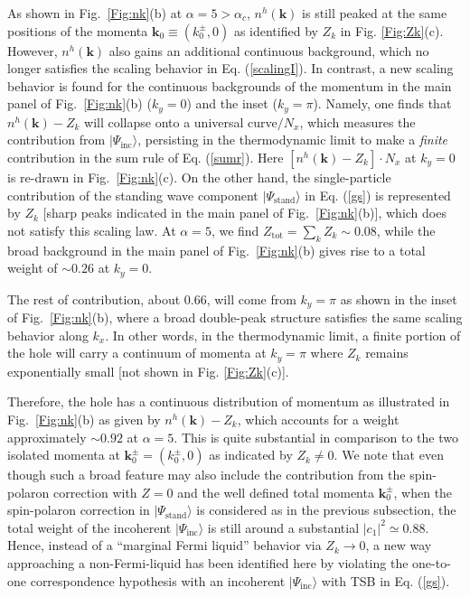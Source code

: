 \documentclass[aps,prb,twocolumn,notitlepage,superscriptaddress,showpacs]{revtex4-1}
\begin{document}
As shown in Fig.~\ref{Fig:nk}(b) at $\alpha=5>\alpha_c$, $n^h({\textbf{k}})$ is still peaked at the same positions of the momenta ${\textbf{k}}_0\equiv (k_0^{\pm}, 0)$ as identified by $Z_k$ in Fig. \ref{Fig:Zk}(c). However, $n^h({\textbf{k}})$ also gains an additional continuous background, which no longer satisfies the scaling behavior in Eq. (\ref{scalingI}). In contrast,  a new scaling behavior is found for the continuous backgrounds of the momentum in the main panel of Fig.~\ref{Fig:nk}(b) ($k_y=0$) and the inset ($k_y=\pi$). Namely, one finds that $n^h({\textbf{k}})-Z_k$ will collapse onto a universal curve$/N_x$, which measures the contribution from $|\Psi_{\mathrm {inc}}\rangle $, persisting in the thermodynamic limit to make a \emph{finite} contribution in the sum rule of Eq. (\ref{sumr}). Here $[n^h({\textbf{k}})-Z_k]\cdot N_x$ at $k_y=0$ is re-drawn in Fig.~\ref{Fig:nk}(c). On the other hand, the single-particle contribution of the standing wave component $|\Psi_{\mathrm {stand}}\rangle$ in Eq. (\ref{gs}) is represented by $Z_k$ [sharp peaks indicated in the main panel of Fig.~\ref{Fig:nk}(b)], which does not satisfy this scaling law.
At $\alpha=5$, we find $Z_{\mathrm{tot}}=\sum_k Z_k \sim 0.08$, while the broad background in the main panel of Fig.~\ref{Fig:nk}(b) gives rise to a total weight of $\sim 0.26$ at $k_y=0$.

The rest of contribution, about $0.66$, will come from $k_y=\pi$ as shown in the inset of
Fig.~\ref{Fig:nk}(b), where a broad double-peak structure satisfies the same scaling behavior along $k_x$. In other words, in the thermodynamic limit, a finite portion of the hole will carry a continuum of momenta at $k_y=\pi$ where $Z_k$ remains exponentially small [not shown in Fig. \ref{Fig:Zk}(c)].

Therefore, the hole has a continuous distribution of momentum as illustrated in Fig.~\ref{Fig:nk}(b) as given by $n^h({\textbf{k}})-Z_k$, which accounts for a weight approximately $\sim 0.92$ at $\alpha=5$. This is quite substantial in comparison to the two isolated momenta at ${\textbf{k}}^{\pm}_0=(k_0^{\pm},0)$ as indicated by $Z_k\neq 0$. We note that even though such a broad feature may also include the contribution from the spin-polaron correction with $Z=0$ and the well defined total momenta ${\textbf{k}}^{\pm}_0$,   when the spin-polaron correction in $|\Psi_{\mathrm {stand}}\rangle$ is considered as in the previous subsection, the total weight of the incoherent $|\Psi_{\mathrm {inc}}\rangle $ is still around a substantial $|c_1|^2 \simeq 0.88$. Hence, instead of a ``marginal Fermi liquid'' behavior \cite{Anderson} via $Z_{k} \rightarrow 0$, a new way approaching a non-Fermi-liquid has been identified here by violating the one-to-one correspondence hypothesis with an incoherent $|\Psi_{\mathrm {inc}}\rangle $ with TSB in Eq. (\ref{gs}).
\end{document}
